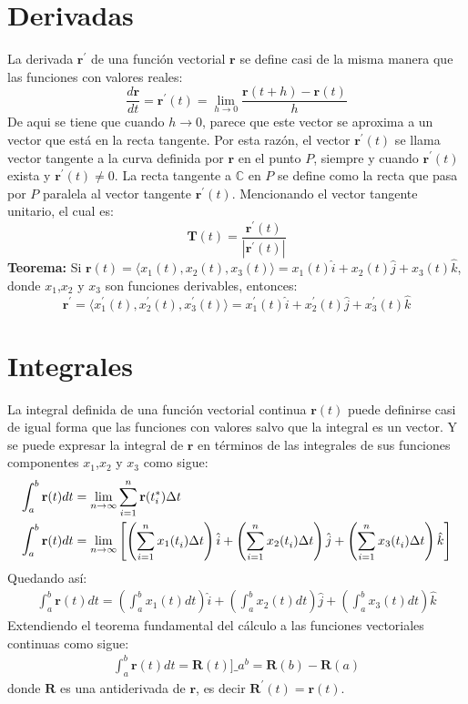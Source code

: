 \documentclass[../main]{subfiles}
\begin{document}
\section{Derivadas}
La derivada $\mathbf{r}^{\prime}$ de una función vectorial $\mathbf{r}$ se define casi de la misma manera que las funciones con valores reales:
\begin{equation}
    \dfrac{d\mathbf{r}}{dt}=\mathbf{r}^{\prime}(t)=\lim_{h\rightarrow 0} \dfrac{\mathbf{r}(t+h)-\mathbf{r}(t)}{h}
\end{equation}
De aqui se tiene que cuando $h \rightarrow 0$, parece que este vector se aproxima a un vector que está en la recta tangente. Por esta razón, el vector $\mathbf{r}^{\prime}(t)$ se llama vector tangente a la curva definida por $\mathbf{r}$ en el punto $P$, siempre y cuando $\mathbf{r}^{\prime}(t)$ exista y $\mathbf{r}^{\prime}(t)\neq 0$. La recta tangente a $\mathbb{C}$ en $P$ se define como la recta que pasa por $P$ paralela al vector tangente $\mathbf{r}^{\prime}(t)$. Mencionando el vector tangente unitario, el cual es:
\begin{equation}
    \mathbf{T}(t)=\dfrac{\mathbf{r}^{\prime}(t)}{|\mathbf{r}^{\prime}(t)|}
\end{equation}
\textbf{Teorema:} Si $\mathbf{r}(t)=\langle x_1(t),x_2(t),x_3(t) \rangle=x_1(t)\hat{i}+x_2(t)\hat{j}+x_3(t)\hat{k}$, donde $x_1$,$x_2$ y $x_3$ son funciones derivables, entonces:
\begin{equation}
    \mathbf{r}^{\prime}=\langle x_1^{\prime}(t),x_2^{\prime}(t),x_3^{\prime}(t) \rangle=x_1^{\prime}(t)\hat{i}+x_2^{\prime}(t)\hat{j}+x_3^{\prime}(t)\hat{k}
\end{equation}
\section{Integrales}
La integral definida de una función vectorial continua $\mathbf{r}(t)$ puede definirse casi de igual forma que las funciones con valores salvo que la integral es un vector. Y se puede expresar la integral de $\mathbf{r}$ en términos de las integrales de sus funciones componentes $x_1$,$x_2$ y $x_3$ como sigue:
\begin{align}
   \int_a^b \mathbf{r}(t)dt & = \lim_{n \rightarrow \infty} \sum_{i=1}^n \mathbf{r}(t_i^{*})\Delta t \nonumber \\
   \int_a^b \mathbf{r}(t)dt & = \lim_{n\rightarrow \infty} \left[ \left( \sum_{i=1}^n x_1(t_i^{\*})\Delta t \right)\hat{i}+\left( \sum_{i=1}^n x_2(t_i^{\*})\Delta t \right)\hat{j}+\left( \sum_{i=1}^n x_3(t_i^{\*})\Delta t \right)\hat{k} \right]
\end{align}
Quedando así:
\begin{align}
    \int_a^b \mathbf{r}(t)dt=\left( \int_a^b x_1(t)dt \right)\hat{i}+\left( \int_a^b x_2(t)dt \right)\hat{j}+\left( \int_a^b x_3(t)dt \right)\hat{k}
\end{align}
Extendiendo el teorema fundamental del cálculo a las funciones vectoriales continuas como sigue:
\begin{align}
    \int_a^b \mathbf{r}(t)dt=\mathbf{R}(t)]\_{a}^b =\mathbf{R}(b)-\mathbf{R}(a)
\end{align}
donde $\mathbf{R}$ es una antiderivada de $\mathbf{r}$, es decir $\mathbf{R}^{\prime}(t)=\mathbf{r}(t)$.
\end{document}
